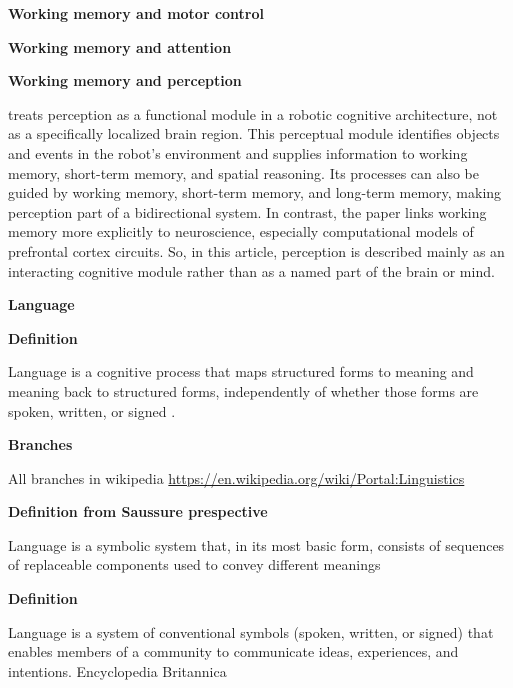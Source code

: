 \documentclass{book}
\providecommand{\ProjectDeepHeading}[2]{%
    \par\medskip\noindent\textbf{#2}\par\smallskip
}
\begin{document}
    
    
    \ProjectDeepHeading{8}{Working memory and motor control}
        \cite{marvel-2019-how-the-motor-system-integrates-with-working-memory}
        
        \cite{mcdougle-2026-motor-working-memory}
    
    \ProjectDeepHeading{8}{Working memory and attention}
    
        \cite{oberauer-2019-working-memory-and-attention-a-conceptual-analysis-and-review}
    
    
    \ProjectDeepHeading{8}{Working memory and perception}
        \cite{wilkes-2005-working-memory-and-perception} treats perception as a functional module in a robotic cognitive architecture, not as a specifically localized brain region.
        This perceptual module identifies objects and events in the robot’s environment and supplies information to working memory, short-term memory, and spatial reasoning.
        Its processes can also be guided by working memory, short-term memory, and long-term memory, making perception part of a bidirectional system.
        In contrast, the paper links working memory more explicitly to neuroscience, especially computational models of prefrontal cortex circuits.
        So, in this article, perception is described mainly as an interacting cognitive module rather than as a named part of the brain or mind.

\ProjectDeepHeading{4}{Language}


\ProjectDeepHeading{7}{Definition}
    Language is a cognitive process that maps structured forms to meaning and meaning back to structured forms, independently of whether those forms are spoken, written, or signed \cite{matchin-2020-the-cortical-organization-of-syntax}.
    
    \ProjectDeepHeading{7}{Branches}
    All branches in wikipedia
    \url{https://en.wikipedia.org/wiki/Portal:Linguistics}
    
    
    \ProjectDeepHeading{7}{Definition from Saussure prespective}
        Language is a symbolic system that, in its most basic form, consists of sequences of replaceable components used to convey different meanings \cite{saussure-1916-course-in-general-linguistics}
        
        
    \ProjectDeepHeading{7}{Definition}
        Language is a system of conventional symbols (spoken, written, or signed) that enables members of a community to communicate ideas, experiences, and intentions.
        Encyclopedia Britannica
        
\end{document}
